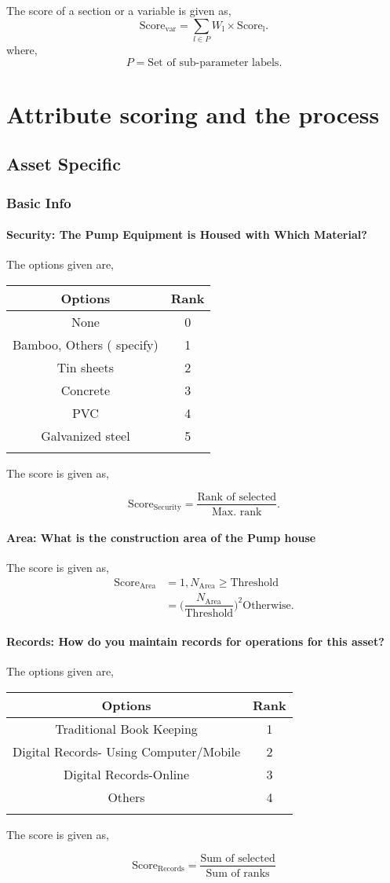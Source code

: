 \documentclass[oneside,twocolumn]{article}
\newcommand{\tsub}[2]{\text{#1}_{\text{#2}}}
\newcommand{\tsubb}[2]{#1_{\text{#2}}}
\newcommand{\dsub}[2]{\dfrac{\text{#1}}{\text{#2}}}
\newcommand{\multsel}[1]
{
	\[
		\tsub{Score}{#1} = \dsub{Sum of selected}{Sum of ranks}
	\]
}
\newcommand{\singsel}[1]
{
	\[
		\tsub{Score}{#1} = \dsub{Rank of selected}{Max. rank}.
	\]
}
\newenvironment{ttable}
{
\begin{center}
\begin{tabular}{c|c}
\hline
}
{
\\ \hline
\end{tabular}
\end{center}
}
\begin{document}
The score of a section or a variable is given as,
\[
	\tsub{Score}{var} = \sum_{l \in P} \tsubb{W}{l} \times \tsub{Score}{l}.
\]
where,
\[
	P = \text{Set of sub-parameter labels.}
\]
\section{Attribute scoring and the
process}
\subsection{Asset Specific}
\subsubsection{Basic Info}

\paragraph{Security: The Pump Equipment is Housed with Which Material?}

The options given are,
\begin{ttable}
Options & Rank \\ \hline
None & 0 \\
Bamboo, Others ( specify) & 1 \\
Tin sheets & 2 \\
Concrete & 3 \\
PVC & 4 \\
Galvanized steel & 5 \\
\hline
\end{ttable}
The score is given as,
\singsel{Security}
\paragraph{Area: What is the construction area of the Pump house}

The score is given as,
\begin{align*}
\tsub{Score}{Area} &= 1, \tsubb{N}{Area} \ge \text{Threshold} \\
        &=
\Big(\dfrac{\tsubb{N}{Area}}{\text{Threshold}}\Big)^{2}
\text{Otherwise}.
\end{align*}
\paragraph{Records: How do you maintain records for operations for this asset?}

The options given are,
\begin{ttable}
Options & Rank \\ \hline
Traditional Book Keeping & 1 \\
Digital Records- Using Computer/Mobile & 2 \\
Digital Records-Online & 3 \\
Others & 4 \\
\hline
\end{ttable}
The score is given as,
\multsel{Records}
\end{document}
